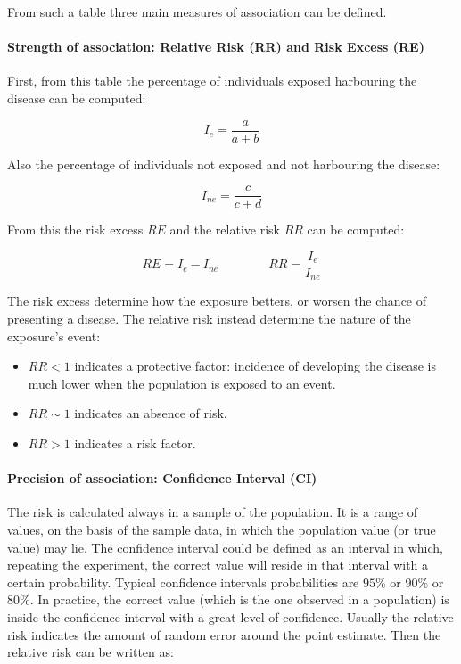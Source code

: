 		From such a table three main measures of association can be defined.

			\paragraph{Strength of association: Relative Risk (RR) and Risk Excess (RE)}
			First, from this table the percentage of individuals exposed harbouring the disease can be computed:

			$$I_e = \frac{a}{a+b}$$

			Also the percentage of individuals not exposed and not harbouring the disease:

			$$I_{ne} = \frac{c}{c+d}$$

			From this the risk excess $RE$ and the relative risk $RR$ can be computed:

			$$RE = I_e - I_{ne} \qquad\qquad RR= \frac{I_e}{I_{ne}}$$

			The risk excess determine how the exposure betters, or worsen the chance of presenting a disease.
			The relative risk instead determine the nature of the exposure's event:

			\begin{multicols}{2}
				\begin{itemize}
					\item $RR<1$ indicates a protective factor: incidence of developing the disease is much lower when the population is exposed to an event.
					\item $RR \sim 1$ indicates an absence of risk.
					\item $RR> 1$ indicates a risk factor.
				\end{itemize}
			\end{multicols}


			\paragraph{Precision of association: Confidence Interval (CI)}
			The risk is calculated always in a sample of the population.
			It is a range of values, on the basis of the sample data, in which the population value (or true value) may lie.
			The confidence interval could be defined as an interval in which, repeating the experiment, the correct value will reside in that interval with a certain probability.
			Typical confidence intervals probabilities are $95\%$ or $90\%$ or $80\%$.
			In practice, the correct value (which is the one observed in a population) is inside the confidence interval with a great level of confidence.
			Usually the relative risk indicates the amount of random error around the point estimate.
			Then the relative risk can be written as:

